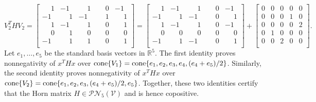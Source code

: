 \documentclass[12pt]{article}
\newcommand{\reals}{\mathbb{R}}
\newcommand{\cone}{\operatornamewithlimits{cone}}
\newcommand{\mcV}{\mathcal{V}}
\newcommand{\mcPN}{\mathcal{PN}}
\theoremstyle{remark}
\begin{document}
\[
V_2^THV_2=\begin{bmatrix}
    \phantom{-}1 & -1            & \phantom{-}1  & \phantom{-}0  & -1            \\
    -1            & \phantom{-}1  & -1            & \phantom{-}1  & \phantom{-}1 \\
    \phantom{-}1 & -1            & \phantom{-}1  & \phantom{-}0  & \phantom{-}1 \\
    \phantom{-}0 & \phantom{-}1  & \phantom{-}0  & \phantom{-}0  & \phantom{-}0 \\
    -1            & \phantom{-}1  & \phantom{-}1  & \phantom{-}0  & \phantom{-}1 \\
\end{bmatrix}=\begin{bmatrix}
    \phantom{-}1 & -1            & \phantom{-}1  & \phantom{-}0  & -1            \\
    -1            & \phantom{-}1  & -1            & \phantom{-}0  & \phantom{-}1 \\
    \phantom{-}1 & -1            & \phantom{-}1  & \phantom{-}0  & -1            \\
    \phantom{-}0 & \phantom{-}0  & \phantom{-}0  & \phantom{-}0  & \phantom{-}0 \\
    -1            & \phantom{-}1  & -1            & \phantom{-}0  & \phantom{-}1 \\
\end{bmatrix}+\begin{bmatrix}
     0 & 0 & 0 & 0 & 0 \\
     0 & 0 & 0 & 1 & 0 \\
     0 & 0 & 0 & 0 & 2 \\
     0 & 1 & 0 & 0 & 0 \\
     0 & 0 & 2 & 0 & 0 \\
\end{bmatrix}.
\]
Let $e_1,\ldots,e_5$ be the standard basis vectors in $\reals^5$. The first identity proves nonnegativity of $x^THx$ over $\cone\{V_1\}=\cone\{e_1,e_2,e_3,e_4,(e_4+e_5)/2\}$. Similarly, the second identity proves nonnegativity of $x^THx$ over $\cone\{V_2\}=\cone\{e_1,e_2,e_3,(e_4+e_5)/2,e_5\}$. 
Together, these two identities certify that the Horn matrix $H\in\mcPN_5(\mcV)$ and is hence copositive. 
\end{document}
